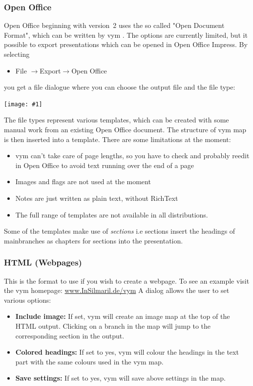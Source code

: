 \documentclass[12pt,a4paper]{article}
\newcommand{\maximage}[1]{  
    \begin{center}
        \texttt{[image: \#1]} 
    \end{center}
}
\newcommand{\vym}{{\sc vym }}
\newcommand{\ra}{$\longrightarrow$}
\begin{document}
\subsubsection*{Open Office}
Open Office beginning with version~2 uses the so called "Open Document
Format", which can be written by \vym. The options are currently
limited, but it possible to export presentations which can be opened in
Open Office Impress. By selecting
\begin{itemize}
    \item File  \ra Export\ra Open Office
\end{itemize}
you get a file dialogue where you can choose the output file and the
file type:
    \maximage{images/export-oo.png}
The file types represent various templates, which can be created with
some manual work from an existing Open Office document. The structure of
\vym map is then inserted into a template.  There are some limitations
at the moment:
\begin{itemize}
    \item \vym can't take care of page lengths, so you have to check and
    probably reedit in Open Office to avoid text running over the end of
    a page
    \item Images and flags are not used at the moment
    \item Notes are just written as plain text, without RichText 
    \item The full range of templates are not available in all
    distributions.   
\end{itemize}
Some of the templates make use of {\em sections} i.e sections insert the
headings of mainbranches as chapters for sections into the presentation.

\subsubsection*{HTML (Webpages)}
This is the format to use if you wish to create a webpage. To see an example
visit the \vym homepage: 
\href{http://www.InSilmaril.de/vym}{www.InSilmaril.de/vym}
A dialog allows the user to set various options:
\begin{itemize}
    \item {\bf Include image:} If set, \vym will create an image map at
    the top of the HTML output. Clicking on a branch in the map will
    jump to the corresponding section in the output.

    \item {\bf Colored headings:}
    If set to yes, \vym will colour the headings in the text part  with the
    same colours used in the \vym map.
    \item {\bf Save settings:}
    If set to yes, \vym will save above settings in the map.
\end{itemize}
\end{document}
